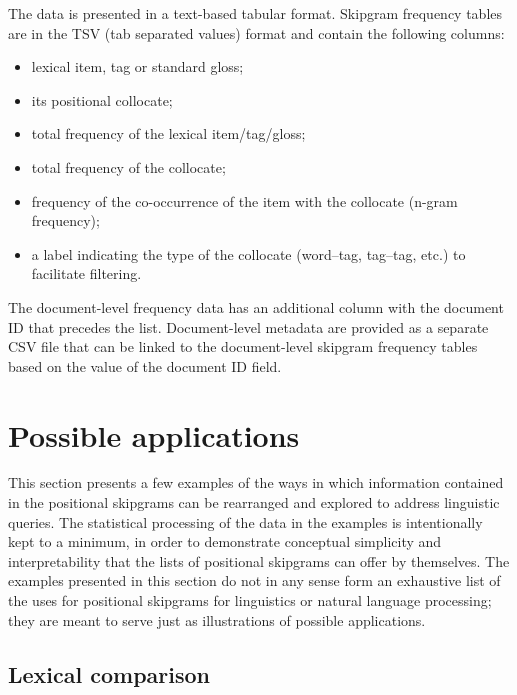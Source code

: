 \documentclass[12pt]{article}
\begin{document}
The data is presented in a text-based tabular format. Skipgram
frequency tables are in the TSV (tab separated values) format and
contain the following columns:
\begin{itemize}
\item lexical item, tag or standard gloss;
\item its positional collocate;
\item total frequency of the lexical item/tag/gloss;
\item total frequency of the collocate;
\item frequency of the co-occurrence of the item with the collocate
  (n-gram frequency);
\item a label indicating the type of the collocate (word--tag,
  tag--tag, etc.) to facilitate filtering.
\end{itemize}
The document-level frequency data has an additional column with the
document ID that precedes the list.  Document-level metadata are provided
as a separate CSV file that can be linked to the document-level
skipgram frequency tables based on the value of the document ID
field. 



\section{Possible applications}
\label{sec:applications}

This section presents a few examples of the ways in which information
contained in the positional skipgrams can be rearranged and explored
to address linguistic queries. The statistical processing of the data
in the examples is intentionally kept to a minimum, in order to
demonstrate conceptual simplicity and interpretability that the lists
of positional skipgrams can offer by themselves.  The examples
presented in this section do not in any sense form an exhaustive list
of the uses for positional skipgrams for linguistics or natural
language processing; they are meant to serve just as illustrations of
possible applications.

\subsection{Lexical comparison}
\end{document}
